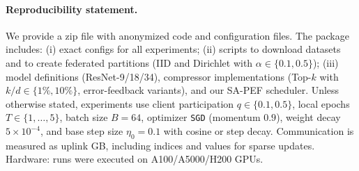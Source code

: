 \documentclass{article} %
\begin{document}
\paragraph{Reproducibility statement.}
We provide a zip file with anonymized code and configuration files. The package includes:
(i) exact configs for all experiments;
(ii) scripts to download datasets and to create federated partitions (IID and Dirichlet with $\alpha\in\{0.1,0.5\}$);
(iii) model definitions (ResNet-9/18/34), compressor implementations (Top-$k$ with $k/d\in\{1\%,10\%\}$, error-feedback variants), and our SA-PEF scheduler.
Unless otherwise stated, experiments use client participation $q\in\{0.1,0.5\}$, local epochs $T\in\{1,\ldots,5\}$, batch size $B=64$, optimizer \texttt{SGD} (momentum $0.9$), weight decay $5\!\times\!10^{-4}$, and base step size $\eta_0=0.1$ with cosine or step decay. Communication is measured as uplink GB, including indices and values for sparse updates. Hardware: runs were executed on A100/A5000/H200 GPUs.




\end{document}
